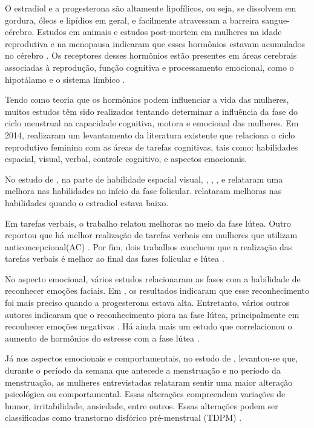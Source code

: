 O estradiol e a progesterona são altamente lipofílicos, ou seja, se dissolvem em gordura, óleos e 
lipídios em geral, e facilmente atravessam a barreira sangue-cérebro. Estudos em animais e estudos 
post-mortem em mulheres na idade reprodutiva e na menopausa indicaram que esses hormônios estavam 
acumulados no cérebro \cite{bixo1997}. Os receptores desses hormônios estão presentes em áreas 
cerebrais associadas à reprodução, função cognitiva e processamento emocional, como o hipotálamo e o 
sistema límbico \cite{gruber2002, brinton2008}.


Tendo como teoria que os hormônios podem influenciar a vida das mulheres, muitos estudos têm sido 
realizados tentando determinar a influência da fase do ciclo menstrual na capacidade cognitiva, 
motora e emocional das mulheres. Em 2014,  realizaram um levantamento da 
literatura existente que relaciona o ciclo reprodutivo feminino com as áreas de tarefas cognitivas, 
tais como: habilidades espacial, visual, verbal, controle cognitivo, e aspectos emocionais.


No estudo de , na parte de habilidade espacial visual, 
, , ,  e  relataram uma melhora 
nas habilidades no início da fase folicular.  relataram melhoras nas habilidades quando o 
estradiol estava baixo. 


Em tarefas verbais, o trabalho \cite{maki2002} relatou melhoras no meio da fase lútea. Outro 
reportou que há melhor realização de tarefas verbais em mulheres que utilizam anticoncepcional(AC) 
\cite{mordecai2008}. Por fim, dois trabalhos concluem que a realização das tarefas verbais é melhor 
ao final das fases folicular e lútea \cite{Rosenberg2002, solis2004}.


No aspecto emocional, vários estudos relacionaram as fases com a habilidade de reconhecer emoções 
faciais. Em , os resultados indicaram que esse reconhecimento foi mais 
preciso quando a progesterona estava alta. Entretanto, vários outros autores indicaram que o 
reconhecimento piora na fase lútea, principalmente em reconhecer emoções negativas \cite{gasbarri2008}.
Há ainda mais um estudo que correlacionou o aumento de hormônios do estresse com a fase lútea \cite{kirschbaum1999}.



Já nos aspectos emocionais e comportamentais, no estudo de , levantou-se que, 
durante o período da semana que antecede a menstruação e no período da menstruação, as mulheres 
entrevistadas relataram sentir uma maior alteração psicológica ou comportamental. Essas alterações 
compreendem variações de humor, irritabilidade, ansiedade, entre outros. Essas alterações podem ser 
classificadas como transtorno disfórico pré-menstrual (TDPM) \cite{ACOG2000}.

